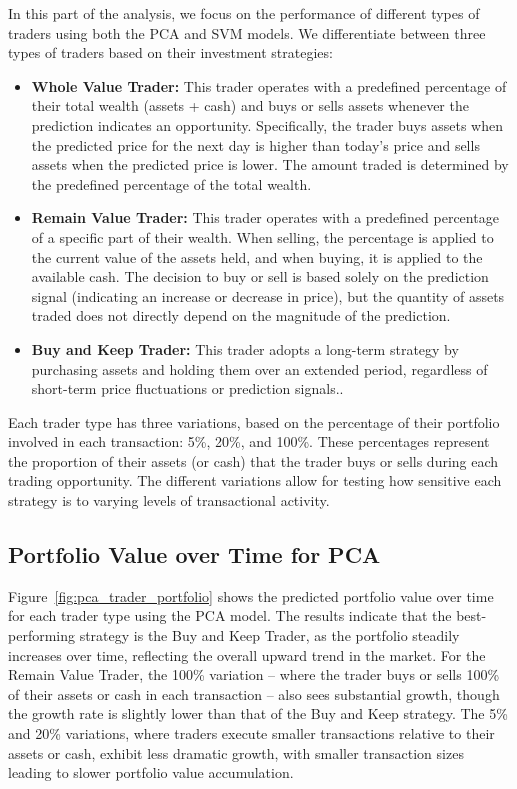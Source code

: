 \documentclass[journal]{IEEEtran}
\begin{document}
In this part of the analysis, we focus on the performance of different types of traders using both the PCA and SVM models. We differentiate between three types of traders based on their investment strategies: 
\begin{itemize}
    \item \textbf{Whole Value Trader:} This trader operates with a predefined percentage of their total wealth (assets + cash) and buys or sells assets whenever the prediction indicates an opportunity. Specifically, the trader buys assets when the predicted price for the next day is higher than today’s price and sells assets when the predicted price is lower. The amount traded is determined by the predefined percentage of the total wealth.
    \item \textbf{Remain Value Trader:} This trader operates with a predefined percentage of a specific part of their wealth. When selling, the percentage is applied to the current value of the assets held, and when buying, it is applied to the available cash. The decision to buy or sell is based solely on the prediction signal (indicating an increase or decrease in price), but the quantity of assets traded does not directly depend on the magnitude of the prediction.
    \item \textbf{Buy and Keep Trader:} This trader adopts a long-term strategy by purchasing assets and holding them over an extended period, regardless of short-term price fluctuations or prediction signals..
\end{itemize}

Each trader type has three variations, based on the percentage of their portfolio involved in each transaction: 5\%, 20\%, and 100\%. These percentages represent the proportion of their assets (or cash) that the trader buys or sells during each trading opportunity. The different variations allow for testing how sensitive each strategy is to varying levels of transactional activity.

\subsection{Portfolio Value over Time for PCA}

Figure~\ref{fig:pca_trader_portfolio} shows the predicted portfolio value over time for each trader type using the PCA model. The results indicate that the best-performing strategy is the Buy and Keep Trader, as the portfolio steadily increases over time, reflecting the overall upward trend in the market. For the Remain Value Trader, the 100\% variation -- where the trader buys or sells 100\% of their assets or cash in each transaction -- also sees substantial growth, though the growth rate is slightly lower than that of the Buy and Keep strategy. The 5\% and 20\% variations, where traders execute smaller transactions relative to their assets or cash, exhibit less dramatic growth, with smaller transaction sizes leading to slower portfolio value accumulation.
\end{document}
